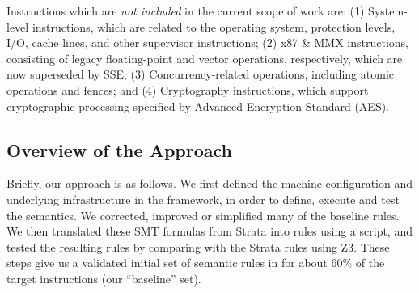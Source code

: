 Instructions which are \emph{not included} in the current scope of work are: 
(1) System-level instructions, which are related to the operating system, 
protection levels, I/O, cache lines, and other supervisor instructions; 
(2) x87 \& MMX instructions, consisting of legacy floating-point and vector operations, respectively, which are now superseded by SSE; 
(3) Concurrency-related operations, including atomic operations and fences; and 
(4) Cryptography instructions, which support cryptographic processing specified by Advanced Encryption Standard (AES). 
%



\subsection{Overview of the Approach}
\label{sec:Approach:Overview}

Briefly, our approach is as follows.
%
We first defined the machine configuration and underlying infrastructure in the \K framework, in order to define, execute and test the \ISA semantics.
%
%
We corrected, improved or simplified many of the baseline rules.
%
We then translated these SMT formulas from Strata into \K rules using a script, and tested the resulting rules by comparing with the Strata rules using Z3.
%
These steps give us a validated initial set of semantic rules in \K for about 60\% of the target instructions (our ``baseline'' set).

